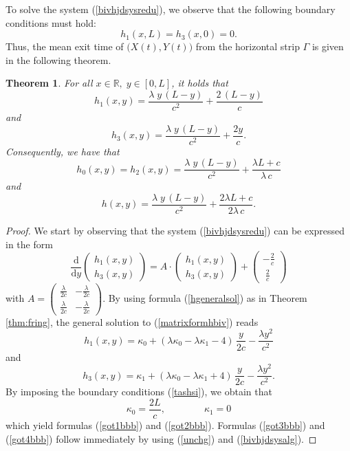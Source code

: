 \documentclass{article}
\newtheorem{thm}{Theorem}
\begin{document}
To solve the system (\ref{bivhjdsysredu}), we observe that the following boundary conditions must hold:
\begin{equation}\label{tashsi}h_1(x,L)=h_3(x,0)=0.\end{equation}
Thus, the mean exit time of $\big(X(t),Y(t)\big)$ from the horizontal strip $\Gamma$ is given in the following theorem.
\begin{thm}
For all $x\in\mathbb{R},\;y\in[0,L]$, it holds that
\begin{equation}\label{got1bbb}h_1(x,y)=\frac{\lambda\;y\,(L-y)}{c^2}+\frac{2\,(L-y)}{c}\end{equation}
and
\begin{equation}\label{got2bbb}h_3(x,y)=\frac{\lambda\;y\,(L-y)}{c^2}+\frac{2y}{c}.\end{equation}
Consequently, we have that
\begin{equation}\label{got3bbb}h_0(x,y)=h_2(x,y)=\frac{\lambda\;y\,(L-y)}{c^2}+\frac{\lambda L +c}{\lambda\,c}\end{equation}
and \begin{equation}\label{got4bbb}h(x,y)=\frac{\lambda\;y\,(L-y)}{c^2}+\frac{2\lambda L +c}{2\lambda\,c}.\end{equation}
\end{thm}
\begin{proof}
We start by observing that the system (\ref{bivhjdsysredu}) can be expressed in the form
\begin{equation}\frac{\mathrm{d}}{\mathrm{d} y}\begin{pmatrix}h_1(x,y)\\[0.3em]h_3(x,y)\end{pmatrix}=A\cdot\begin{pmatrix}h_1(x,y)\\[0.3em]h_3(x,y)\end{pmatrix}+\begin{pmatrix}-\frac{2}{c}\\[0.3em]\;\frac{2}{c}\end{pmatrix}\label{matrixformhbiv}\end{equation} with $A=\begin{pmatrix}\frac{\lambda}{2c} & -\frac{\lambda}{2c}\\[0.5em]\frac{\lambda}{2c} & -\frac{\lambda}{2c}\end{pmatrix}$. By using formula (\ref{hgeneralsol}) as in Theorem \ref{thm:fring}, the general solution to (\ref{matrixformhbiv}) reads
$$h_1(x,y)=\kappa_0+(\lambda\kappa_0-\lambda\kappa_1-4)\,\frac{y}{2c}-\frac{\lambda y^2}{c^2}$$
and
$$h_3(x,y)=\kappa_1+(\lambda\kappa_0-\lambda\kappa_1+4)\,\frac{y}{2c}-\frac{\lambda y^2}{c^2}.$$
By imposing the boundary conditions (\ref{tashsi}), we obtain that
$$\kappa_0=\frac{2L}{c},\qquad\qquad \kappa_1=0$$
which yield formulas (\ref{got1bbb}) and (\ref{got2bbb}). Formulas (\ref{got3bbb}) and (\ref{got4bbb}) follow immediately by using (\ref{unchg}) and (\ref{bivhjdsysalg}).
\end{proof}




%
\nocite{*}

\end{document}
